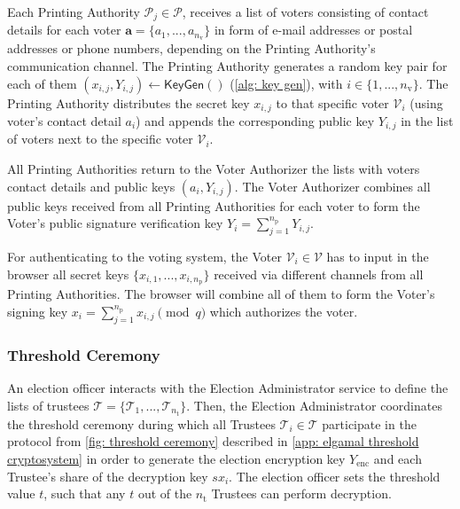 Each Printing Authority $\mathcal{P}_j \in \boldsymbol{\mathcal{P}}$, receives a list of voters consisting of contact details for each voter $\boldsymbol{a} = \{ a_1, ..., a_{n_\mathrm{v}} \}$ in form of e-mail addresses or postal addresses or phone numbers, depending on the Printing Authority's communication channel. The Printing Authority generates a random key pair for each of them $(x_{i, j}, Y_{i, j}) \leftarrow \mathsf{KeyGen}()$ (\cref{alg: key gen}), with $i \in \{ 1, ..., n_\mathrm{v} \}$. The Printing Authority distributes the secret key $x_{i, j}$ to that specific voter $\mathcal{V}_i$ (using voter's contact detail $a_i$) and appends the corresponding public key $Y_{i, j}$ in the list of voters next to the specific voter $\mathcal{V}_i$.

All Printing Authorities return to the Voter Authorizer the lists with voters contact details and public keys $(a_i, Y_{i,j})$. The Voter Authorizer combines all public keys received from all Printing Authorities for each voter to form the Voter's public signature verification key $Y_i = \sum_{j=1}^{n_\mathrm{p}} Y_{i, j}$.

For authenticating to the voting system, the Voter $\mathcal{V}_i \in \boldsymbol{\mathcal{V}}$ has to input in the browser all secret keys $\{ x_{i, 1}, ..., x_{i, n_\mathrm{p}} \}$ received via different channels from all Printing Authorities. The browser will combine all of them to form the Voter's signing key $x_i = \sum_{j=1}^{n_\mathrm{p}} x_{i, j} \pmod q$ which authorizes the voter.


\subsubsection{Threshold Ceremony} \label{sec: threshold ceremony}
An election officer interacts with the Election Administrator service to define the lists of trustees $\boldsymbol{\mathcal{T}} = \{ \mathcal{T}_1, ..., \mathcal{T}_{n_\mathrm{t}} \}$. Then, the Election Administrator coordinates the threshold ceremony during which all Trustees $\mathcal{T}_i \in \boldsymbol{\mathcal{T}}$ participate in the protocol from \cref{fig: threshold ceremony} described in \cref{app: elgamal threshold cryptosystem} in order to generate the election encryption key $Y_\mathrm{enc}$ and each Trustee's share of the decryption key $sx_i$. The election officer sets the threshold value $t$, such that any $t$ out of the $n_\mathrm{t}$ Trustees can perform decryption.

